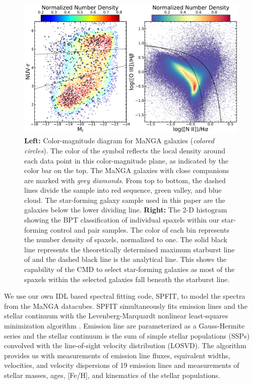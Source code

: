 \documentclass[iop,revtex4,twocolumn,apj,numberedappendix,appendixfloats]{emulateapj}
\begin{document}
\begin{figure}
\centering
\includegraphics[width=\linewidth]{fig/bpt-cmd.pdf}
\caption[]{\textbf{Left:} Color-magnitude diagram for MaNGA galaxies ({\it colored circles}). The color of the symbol reflects the local density around each data point in this color-magnitude plane, as indicated by the color bar on the top. The MaNGA galaxies with close companions are marked with {\it grey diamonds}. From top to bottom, the dashed lines divide the sample into red sequence, green valley, and blue cloud. The star-forming galaxy sample used in this paper are the galaxies below the lower dividing line. \textbf{Right:} The 2-D histogram showing the BPT classification \citep{Baldwin:1981} of individual spaxels within our star-forming control and pair samples. The color of each bin represents the number density of spaxels, normalized to one. The solid black line represents the theoretically determined maximum starburst line of \citet{Kewley:2001} and the dashed black line is the analytical \citet{Kauffmann:2003} line. This shows the capability of the CMD to select star-forming galaxies as most of the spaxels within the selected galaxies fall beneath the starburst line.}
\label{fig:cmd}
\end{figure}

We use our own {\sc IDL} based spectral fitting code, {\sc SPFIT}, to model the spectra from the MaNGA datacubes. {\sc SPFIT} simultaneously fits emission lines and the stellar continuum with the Levenberg-Marquardt nonlinear least-squares minimization algorithm \citep{Fu:2018}. Emission line are parameterized as a Gauss-Hermite series and the stellar continuum is the sum of simple stellar populations (SSPs) convolved with the line-of-sight velocity distribution (LOSVD). The algorithm provides us with measurements of emission line fluxes, equivalent widths, velocities, and velocity dispersions of 19 emission lines and measurements of stellar masses, ages, [Fe/H], and kinematics of the stellar populations. 
\end{document}
